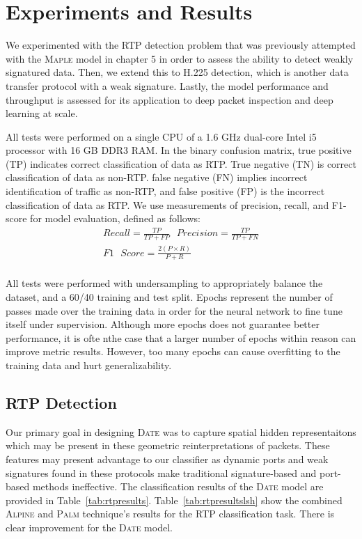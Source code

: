 \section{Experiments and Results}

We experimented with the RTP detection problem that was previously attempted with the \textsc{Maple} model in chapter 5 in order to assess the ability to detect weakly signatured data. Then, we extend this to H.225 detection, which is another data transfer protocol with a weak signature. Lastly, the model performance and throughput is assessed for its application to deep packet inspection and deep learning at scale.

All tests were performed on a single CPU of a 1.6 GHz dual-core Intel i5 processor with 16 GB DDR3 RAM. In the binary confusion matrix, true positive (TP) indicates correct classification of data as RTP. True negative (TN) is correct classification of data as non-RTP. false negative (FN) implies incorrect identification of traffic as non-RTP, and false positive (FP) is the incorrect classification of data as RTP. We use measurements of precision, recall, and F1-score for model evaluation, defined as follows:
\begin{equation}
\begin{split}
    Recall = \frac{TP}{TP + FP} \text{  }
    Precision = \frac{TP}{TP + FN} \\
    F1\text{ }Score = \frac{2(P\times R)}{P + R} \\
    \end{split}
\end{equation}

All tests were performed with undersampling to appropriately balance the dataset, and a 60/40 training and test split. Epochs represent the number of passes made over the training data in order for the neural network to fine tune itself under supervision. Although more epochs does not guarantee better performance, it is ofte nthe case that a larger number of epochs within reason can improve metric results. However, too many epochs can cause overfitting to the training data and hurt generalizability.

\subsection{RTP Detection}
Our primary goal in designing \textsc{Date} was to capture spatial hidden representaitons which may be present in these geometric reinterpretations of packets. These features may present advantage to our classifier as dynamic ports and weak signatures found in these protocols make traditional signature-based and port-based methods ineffective. The classification results of the \textsc{Date} model are provided in Table~\ref{tab:rtpresults}. Table~\ref{tab:rtpresultslsh} show the combined \textsc{Alpine} and \textsc{Palm} technique's results for the RTP classification task. There is clear improvement for the \textsc{Date} model.

